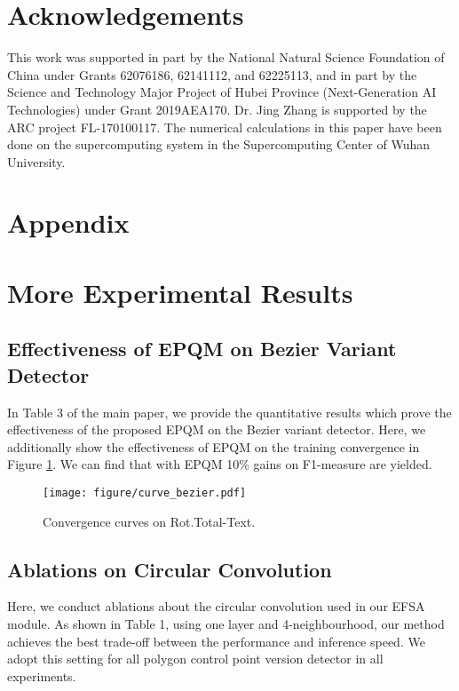 \documentclass[letterpaper]{article} \usepackage{aaai23}  \usepackage{times}  \usepackage{helvet}  \usepackage{courier}  \usepackage[hyphens]{url}  \usepackage{graphicx} \urlstyle{rm}
\begin{document}
\section*{Acknowledgements}
This work was supported in part by the National Natural Science Foundation of China under Grants 62076186, 62141112, and 62225113, and in part by the Science and Technology Major Project of Hubei Province (Next-Generation AI Technologies) under Grant 2019AEA170. Dr. Jing Zhang is supported by the ARC project FL-170100117. The numerical calculations in this paper have been done on the supercomputing system in the Supercomputing Center of Wuhan University.

\appendix
{\centering\section*{Appendix}}

\section{More Experimental Results}
\subsection{Effectiveness of EPQM on Bezier Variant Detector}
In Table 3 of the main paper, we provide the quantitative results which prove the effectiveness of the proposed EPQM on the Bezier variant detector. Here, we additionally show the effectiveness of EPQM on the training convergence in Figure \ref{fig:bezier_curve}. We can find that with EPQM 10\% gains on F1-measure are yielded.

\begin{figure}[h]
    \centering
    \texttt{[image: figure/curve\_bezier.pdf]}
    \caption{Convergence curves on Rot.Total-Text.}
    \label{fig:bezier_curve}
    \vspace{-5mm}
\end{figure}

\subsection{Ablations on Circular Convolution}
Here, we conduct ablations about the circular convolution used in our EFSA module. As shown in Table 1, using one layer and 4-neighbourhood, our method achieves the best trade-off between the performance and inference speed. We adopt this setting for all polygon control point version detector in all experiments.
\end{document}
